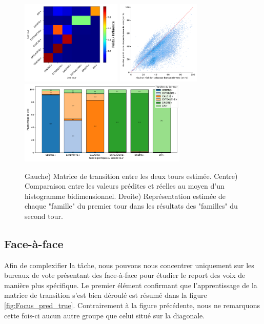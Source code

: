 \documentclass[11pt]{article}
\begin{document}
            \begin{figure}[h]
                \begin{center}
                    \includegraphics[height=4cm]{Famille_Matrice.pdf}
                    \includegraphics[height=4cm]{Famille_True_Pred_Hist.pdf}
                    \includegraphics[height=4cm]{Famille_Proportions.pdf}
                    \caption{Gauche) Matrice de transition entre les deux tours estimée. Centre) Comparaison entre les valeurs prédites et réelles au moyen d'un histogramme bidimensionnel. Droite) Représentation estimée de chaque "famille" du premier tour dans les résultats des "familles" du second tour.}
                    \label{fig:Famille}
                \end{center}
            \end{figure}

        \subsection*{Face-à-face}

            Afin de complexifier la tâche, nous pouvons nous concentrer uniquement sur les bureaux de vote présentant des face-à-face pour étudier le report des voix de manière plus spécifique. Le premier élément confirmant que l'apprentissage de la matrice de transition s'est bien déroulé est résumé dans la figure \ref{fig:Focus_pred_true}. Contrairement à la figure précédente, nous ne remarquons cette fois-ci aucun autre groupe que celui situé sur la diagonale.
            
\end{document}
